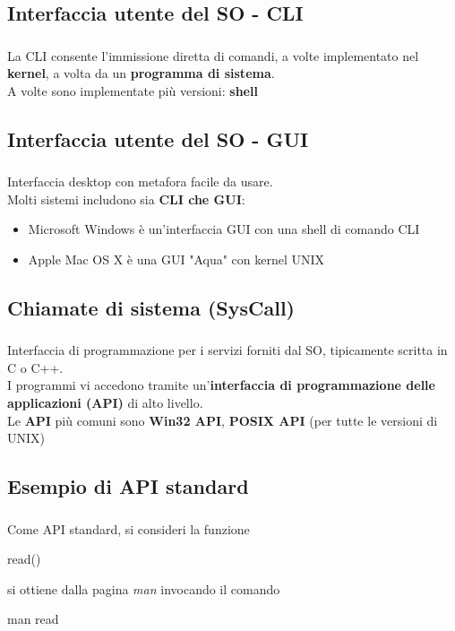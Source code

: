 \documentclass{beamer}
\newenvironment{mainframe}{
	\begin{frame}
		\frametitle{\insertsubsection}
		\framesubtitle{\insertsection}
	}{
	\end{frame}
}
\begin{document}
\subsection{Interfaccia utente del SO - CLI}
\begin{mainframe}
	La CLI consente l'immissione diretta di comandi, a volte implementato nel \textbf{kernel}, a volta da un \textbf{programma di sistema}.\\
	A volte sono implementate più versioni: \textbf{shell}
\end{mainframe}
\subsection{Interfaccia utente del SO - GUI}
\begin{mainframe}
	Interfaccia desktop con metafora facile da usare.\\
	Molti sistemi includono sia \textbf{CLI che GUI}:
	\begin{itemize}
		\item Microsoft Windows è un'interfaccia GUI con una shell di comando CLI
		\item Apple Mac OS X è una GUI "Aqua" con kernel UNIX
	\end{itemize}
\end{mainframe}
\subsection{Chiamate di sistema (SysCall)}
\begin{mainframe}
	Interfaccia di programmazione per i servizi forniti dal SO, tipicamente scritta in C o C++.\\
	I programmi vi accedono tramite un'\textbf{interfaccia di programmazione delle applicazioni (API)} di alto livello.\\
	Le \textbf{API} più comuni sono \textbf{Win32 API}, \textbf{POSIX API} (per tutte le versioni di UNIX)
\end{mainframe}
\subsection{Esempio di API standard}
\begin{mainframe}
	Come API standard, si consideri la funzione
	\begin{semiverbatim}
		read()
	\end{semiverbatim}
	si ottiene dalla pagina \textit{man} invocando il comando
	\begin{semiverbatim}
		man read
	\end{semiverbatim}
\end{mainframe}
\end{document}
